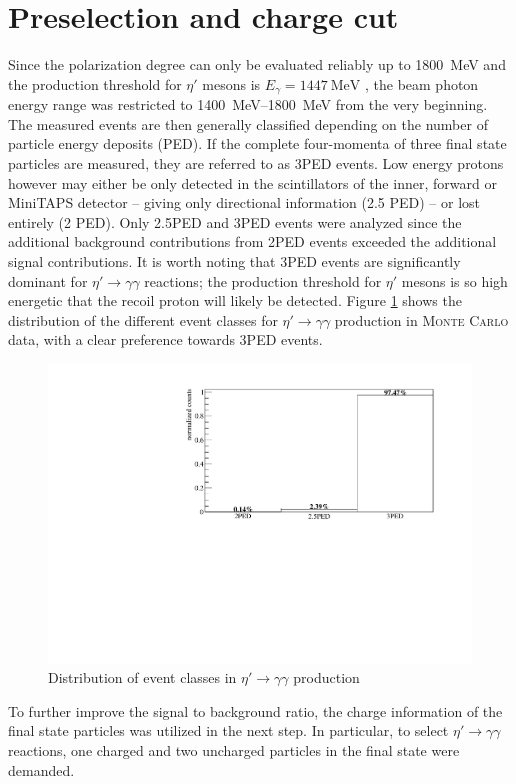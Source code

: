 \section{Preselection and charge cut}
Since the polarization degree can only be evaluated reliably up to \SI{1800}{\mega\eV} and the production threshold for $\eta'$ mesons is $E_\gamma=\SI{1447}{\mega\eV}$ \cite{pdg}, the beam photon energy range was restricted to \SIrange{1400}{1800}{\mega\eV} from the very beginning. The measured events are then generally classified depending on the number of particle energy deposits (PED). If the complete four-momenta of three final state particles are measured, they are referred to as 3PED events. Low energy protons however may either be only detected in the scintillators of the inner, forward or MiniTAPS detector -- giving only directional information (2.5 PED) -- or lost entirely (2 PED). Only 2.5PED and 3PED events were analyzed since the additional background contributions from 2PED events exceeded the additional signal contributions. It is worth noting that 3PED events are significantly dominant for $\eta'\to\gamma\gamma$ reactions; the production threshold for $\eta'$ mesons is so high energetic that the recoil proton will likely be detected. Figure \ref{fig:PEDs} shows the distribution of the different event classes for $\eta'\to\gamma\gamma$ production in \textsc{Monte Carlo} data, with a clear preference towards 3PED events.

\begin{figure}[htbp]
	\centering
	\includegraphics[width=\linewidth]{../figs/hydrogen/PEDs.pdf}
	\caption{Distribution of event classes in $\eta'\to\gamma\gamma$ production}
	\label{fig:PEDs}
\end{figure}
To further improve the signal to background ratio, the charge information of the final state particles was utilized in the next step. In particular, to select  $\eta'\to\gamma\gamma$ reactions, one charged and two uncharged particles in the final state were demanded. 

